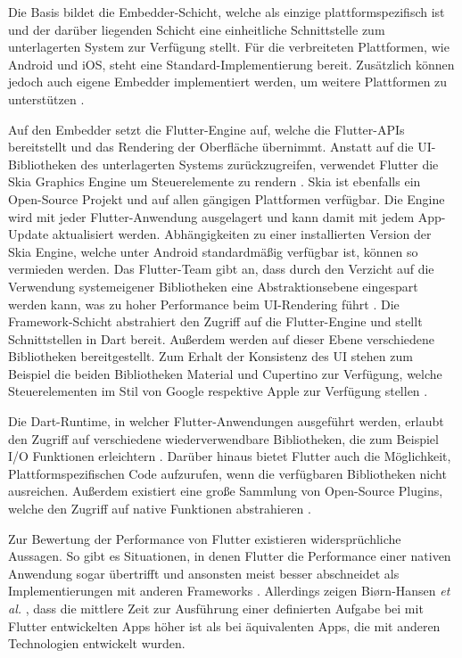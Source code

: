Die Basis bildet die Embedder-Schicht, welche als einzige plattformspezifisch ist und der darüber liegenden Schicht eine einheitliche Schnittstelle zum unterlagerten System zur Verfügung stellt.
Für die verbreiteten Plattformen, wie Android und iOS, steht eine Standard-Implementierung bereit.
Zusätzlich können jedoch auch eigene Embedder implementiert werden, um weitere Plattformen zu unterstützen \cite{Flutter_Architektur}.

Auf den Embedder setzt die Flutter-Engine auf, welche die Flutter-\acp{API} bereitstellt und das Rendering der Oberfläche übernimmt.
Anstatt auf die \ac{UI}-Bibliotheken des unterlagerten Systems zurückzugreifen, verwendet Flutter die Skia Graphics Engine um Steuerelemente zu rendern \cite{Biorn-Hansen_PerformanceOverhead_CrossPlatform}.
Skia ist ebenfalls ein Open-Source Projekt und auf allen gängigen Plattformen verfügbar.
Die Engine wird mit jeder Flutter-Anwendung ausgelagert und kann damit mit jedem App-Update aktualisiert werden.
Abhängigkeiten zu einer installierten Version der Skia Engine, welche unter Android standardmäßig verfügbar ist, können so vermieden werden.
Das Flutter-Team gibt an, dass durch den Verzicht auf die Verwendung systemeigener Bibliotheken eine Abstraktionsebene eingespart werden kann, was zu hoher Performance beim \ac{UI}-Rendering führt \cite{Flutter_Architektur}.
Die Framework-Schicht abstrahiert den Zugriff auf die Flutter-Engine und stellt Schnittstellen in Dart bereit.
Außerdem werden auf dieser Ebene verschiedene Bibliotheken bereitgestellt.
Zum Erhalt der Konsistenz des \ac{UI} stehen zum Beispiel die beiden Bibliotheken Material und Cupertino zur Verfügung, welche Steuerelementen im Stil von Google respektive Apple zur Verfügung stellen \cite{Manchanda_CrossPlatformFrameworks, Flutter_Architektur}.


Die Dart-Runtime, in welcher Flutter-Anwendungen ausgeführt werden, erlaubt den Zugriff auf verschiedene wiederverwendbare Bibliotheken, die zum Beispiel \ac{I/O} Funktionen erleichtern \cite{Dart_Overview}.
Darüber hinaus bietet Flutter auch die Möglichkeit, Plattformspezifischen Code aufzurufen, wenn die verfügbaren Bibliotheken nicht ausreichen.
Außerdem existiert eine große Sammlung von Open-Source Plugins, welche den Zugriff auf native Funktionen abstrahieren \cite{Flutter_Architektur,Fentaw_Thesis_Flutter}.


Zur Bewertung der Performance von Flutter existieren widersprüchliche Aussagen.
So gibt es Situationen, in denen Flutter die Performance einer nativen Anwendung sogar übertrifft und ansonsten meist besser abschneidet als Implementierungen mit anderen Frameworks \cite{Nawrocki_Comparison_Hybrid_Native_Frameworks}.
Allerdings zeigen Bi{\o}rn-Hansen \textit{et al.} \cite{Biorn-Hansen_PerformanceOverhead_CrossPlatform}, dass die mittlere Zeit zur Ausführung einer definierten Aufgabe bei mit Flutter entwickelten Apps höher ist als bei äquivalenten Apps, die mit anderen Technologien entwickelt wurden.

